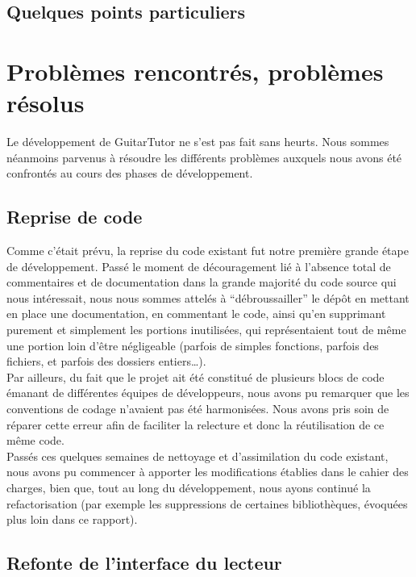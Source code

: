 \documentclass[a4paper,11pt]{article}
\begin{document}
\subsection{Quelques points particuliers}

\clearpage

\section{Problèmes rencontrés, problèmes résolus}

Le développement de GuitarTutor ne s'est pas fait sans heurts. Nous sommes néanmoins parvenus à résoudre les différents problèmes auxquels nous avons été confrontés au cours des phases de développement.

\subsection{Reprise de code}

Comme c'était prévu, la reprise du code existant fut notre première grande étape de développement. Passé le moment de découragement lié à l'absence total de commentaires et de documentation dans la grande majorité du code source qui nous intéressait, nous nous sommes attelés à ``débroussailler'' le dépôt en mettant en place une documentation, en commentant le code, ainsi qu'en supprimant purement et simplement les portions inutilisées, qui représentaient tout de même une portion loin d'être négligeable (parfois de simples fonctions, parfois des fichiers, et parfois des dossiers entiers\dots).\\

Par ailleurs, du fait que le projet ait été constitué de plusieurs blocs de code émanant de différentes équipes de développeurs, nous avons pu remarquer que les conventions de codage n'avaient pas été harmonisées. Nous avons pris soin de réparer cette erreur afin de faciliter la relecture et donc la réutilisation de ce même code.\\

Passés ces quelques semaines de nettoyage et d'assimilation du code existant, nous avons pu commencer à apporter les modifications établies dans le cahier des charges, bien que, tout au long du développement, nous ayons continué la refactorisation (par exemple les suppressions de certaines bibliothèques, évoquées plus loin dans ce rapport).

\subsection{Refonte de l'interface du lecteur}
\end{document}
